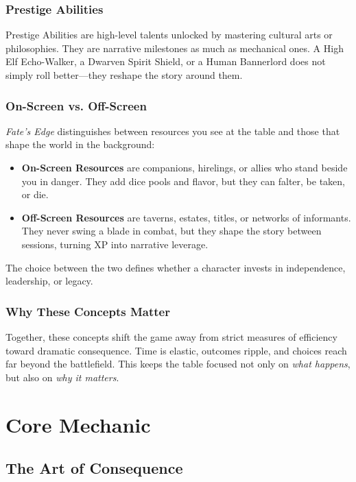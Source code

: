 \documentclass[12pt]{book}
\begin{document}
\section{Prestige Abilities}
Prestige Abilities are high-level talents unlocked by mastering cultural arts or philosophies. They are narrative milestones as much as mechanical ones. A High Elf Echo-Walker, a Dwarven Spirit Shield, or a Human Bannerlord does not simply roll better—they reshape the story around them.  

\section{On-Screen vs. Off-Screen}
\textit{Fate’s Edge} distinguishes between resources you see at the table and those that shape the world in the background:
\begin{itemize}
  \item \textbf{On-Screen Resources} are companions, hirelings, or allies who stand beside you in danger. They add dice pools and flavor, but they can falter, be taken, or die.  
  \item \textbf{Off-Screen Resources} are taverns, estates, titles, or networks of informants. They never swing a blade in combat, but they shape the story between sessions, turning XP into narrative leverage.  
\end{itemize}
The choice between the two defines whether a character invests in independence, leadership, or legacy.  

\section{Why These Concepts Matter}
Together, these concepts shift the game away from strict measures of efficiency toward dramatic consequence. Time is elastic, outcomes ripple, and choices reach far beyond the battlefield. This keeps the table focused not only on \emph{what happens}, but also on \emph{why it matters}.

\part{Core Mechanic}
\chapter{The Art of Consequence}
\end{document}
